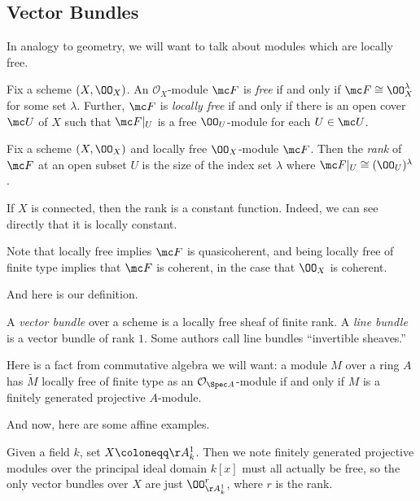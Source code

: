 \documentclass[../notes.tex]{subfiles}
\begin{document}
\subsection{Vector Bundles}
In analogy to geometry, we will want to talk about modules which are locally free.
\begin{definition}
	Fix a scheme $(X,\OO_X)$. An $\mathcal O_X$-module $\mc F$ is \textit{free} if and only if $\mc F\cong\OO_X^\lambda$ for some set $\lambda$. Further, $\mc F$ is \textit{locally free} if and only if there is an open cover $\mc U$ of $X$ such that $\mc F|_U$ is a free $\OO_U$-module for each $U\in\mc U$.
\end{definition}
\begin{definition}[Rank]
	Fix a scheme $(X,\OO_X)$ and locally free $\OO_X$-module $\mc F$. Then the \textit{rank} of $\mc F$ at an open subset $U$ is the size of the index set $\lambda$ where $\mc F|_U\cong(\OO_U)^\lambda$.
\end{definition}
\begin{remark}
	If $X$ is connected, then the rank is a constant function. Indeed, we can see directly that it is locally constant.
\end{remark}
\begin{remark}
	Note that locally free implies $\mc F$ is quasicoherent, and being locally free of finite type implies that $\mc F$ is coherent, in the case that $\OO_X$ is coherent.
\end{remark}
And here is our definition.
\begin{definition}
	A \textit{vector bundle} over a scheme is a locally free sheaf of finite rank. A \textit{line bundle} is a vector bundle of rank $1$. Some authors call line bundles ``invertible sheaves.''
\end{definition}
\begin{remark}
	Here is a fact from commutative algebra we will want: a module $M$ over a ring $A$ has $\widetilde M$ locally free of finite type as an $\mathcal O_{\Spec A}$-module if and only if $M$ is a finitely generated projective $A$-module.
\end{remark}
And now, here are some affine examples.
\begin{example}
	Given a field $k$, set $X\coloneqq\AA^1_k$. Then we note finitely generated projective modules over the principal ideal domain $k[x]$ must all actually be free, so the only vector bundles over $X$ are just $\OO_{\AA^1_k}^{r}$, where $r$ is the rank.
\end{example}
\end{document}
